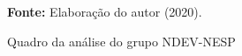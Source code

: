 \begin{figure}[ht!]
\centering

\caption{\textmd{Quadro da análise do grupo NDEV-NESP}}
\label{fig:quadro:grupondevnesp}

\par\medskip\textbf{Fonte:} Elaboração do autor (2020). \par\medskip

\end{figure}

